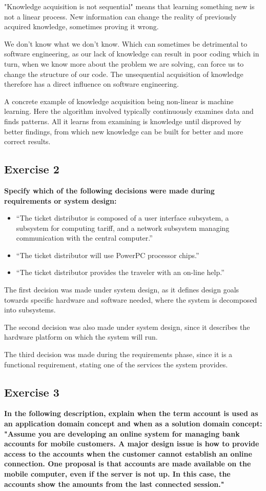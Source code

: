 \documentclass{article}
\begin{document}
"Knowledge acquisition is not sequential" means that learning something new is not a linear process. New information can change the reality of previously acquired knowledge, sometimes proving it wrong.

We don't know what we don't know. Which can sometimes be detrimental to software engineering, as our lack of knowledge can result in poor coding which in turn, when we know more about the problem we are solving, can force us to change the structure of our code. The unsequential acquisition of knowledge therefore has a direct influence on software engineering.

A concrete example of knowledge acquisition being non-linear is machine learning. Here the algorithm involved typically continuously examines data and finds patterns. All it learns from examining is knowledge until disproved by better findings, from which new knowledge can be built for better and more correct results.

\subsection*{Exercise 2}
\textbf{Specify which of the following decisions were made during requirements or system design:}
\begin{itemize}
    \item “The ticket distributor is composed of a user interface subsystem, a subsystem for computing tariff, and a network subsystem managing communication with the central computer.”
    
    \item“The ticket distributor will use PowerPC processor chips.”
    
    \item“The ticket distributor provides the traveler with an on-line help.”
\end{itemize}

The first decision was made under system design, as it defines design goals towards specific hardware and software needed, where the system is decomposed into subsystems.

The second decision was also made under system design, since it describes the hardware platform on which the system will run.

The third decision was made during the requirements phase, since it is a functional requirement, stating one of the services the system provides.

\subsection*{Exercise 3}
\textbf{In the following description, explain when the term account is used as an application domain concept and when as a solution domain concept:
{\color{gray}"Assume you are developing an online system for managing bank accounts for mobile customers. A major design issue is how to provide access to the accounts when the customer cannot establish an online connection. One proposal is that accounts are made available on the mobile computer, even if the server is not up. In this case, the accounts show the amounts from the last connected session."}}
\end{document}
